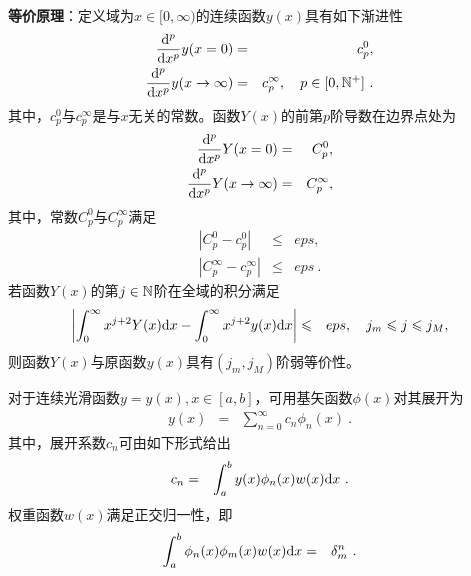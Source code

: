 \begin{theorem} \label{定理-等价原理}
    \textbf{等价原理}：定义域为$x \in [0,\infty)$的连续函数$y(x)$具有如下渐进性
    \begin{eqnarray}
        \frac{\mathrm{d}^p}{\mathrm{d} x^p} y(x=0)  & = & c_p^0, \label{DDx0py}
        \\
        \frac{\mathrm{d}^p}{\mathrm{d} x^p} y (x \to \infty) & = & c_p^\infty, \quad p \in [0,\mathbb{N}^+]  ~. \label{DDx9py} 
    \end{eqnarray}
    其中，$c_p^0$与$c_p^\infty$是与$x$无关的常数。函数$Y(x)$的前第$p$阶导数在边界点处为
    \begin{eqnarray}
        \frac{\mathrm{d}^p}{\mathrm{d} x^p} Y(x=0) & = & C_p^0,  \label{DDx0pY}
        \\
        \frac{\mathrm{d}^p}{\mathrm{d} x^p} Y(x \to \infty)  & = &  C_p^\infty,  \label{DDx9pY}
    \end{eqnarray}
    其中，常数$C_p^0$与$C_p^\infty$满足
    \begin{eqnarray}
        \left |C_p^0 - c_p^0  \right | & \le & eps, 
        \\
        \left |C_p^\infty - c_p^\infty  \right |  & \le & eps ~.
    \end{eqnarray}
    若函数$Y(x)$的第$j \in \mathbb{N}$阶在全域的积分满足
    \begin{eqnarray}
        \left | \int_0^\infty x^{j+2} Y(x) \mathrm{d} x - \int_0^\infty x^{j+2} y (x) \mathrm{d} x \right |  & \leqslant & eps, \quad j_m \leqslant j \leqslant j_M,
    \end{eqnarray}
    则函数$Y(x)$与原函数$y(x)$具有$(j_m,j_M)$阶弱等价性。
\end{theorem}

\begin{theorem} \label{定理-谱展开}
    对于连续光滑函数$y=y(x), x \in [a,b]$，可用基矢函数$\phi (x)$对其展开为
    \begin{eqnarray}
      y(x)  & = &  \sum_{n=0}^{\infty}  c_n \phi_n (x) ~. \label{ycn}
    \end{eqnarray}
    其中，展开系数$c_n$可由如下形式给出
    \begin{eqnarray}
      c_n  & = &  \int_{a}^{b}  y(x) \phi_n (x) w(x) \mathrm{d} x ~. \label{cny}
    \end{eqnarray}
    权重函数$w(x)$满足正交归一性，即
    \begin{eqnarray}
      \int_{a}^{b}  \phi_n (x) \phi_m (x) w(x) \mathrm{d} x & = & \delta_m^n ~. \label{wx}
    \end{eqnarray}
\end{theorem}

